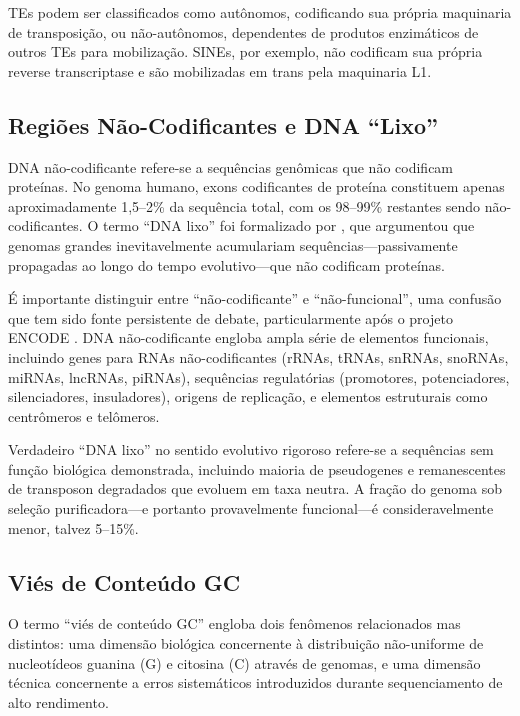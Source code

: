 TEs podem ser classificados como autônomos, codificando sua própria maquinaria de transposição, ou não-autônomos, dependentes de produtos enzimáticos de outros TEs para mobilização. SINEs, por exemplo, não codificam sua própria reverse transcriptase e são mobilizadas em trans pela maquinaria L1.

\subsection{Regiões Não-Codificantes e DNA ``Lixo''}

DNA não-codificante refere-se a sequências genômicas que não codificam proteínas. No genoma humano, exons codificantes de proteína constituem apenas aproximadamente 1,5--2\% da sequência total, com os 98--99\% restantes sendo não-codificantes. O termo ``DNA lixo'' foi formalizado por \textcite{ohno1972}, que argumentou que genomas grandes inevitavelmente acumulariam sequências---passivamente propagadas ao longo do tempo evolutivo---que não codificam proteínas.

É importante distinguir entre ``não-codificante'' e ``não-funcional'', uma confusão que tem sido fonte persistente de debate, particularmente após o projeto ENCODE \parencite{encode2012,doolittle2013,graur2013}. DNA não-codificante engloba ampla série de elementos funcionais, incluindo genes para RNAs não-codificantes (rRNAs, tRNAs, snRNAs, snoRNAs, miRNAs, lncRNAs, piRNAs), sequências regulatórias (promotores, potenciadores, silenciadores, insuladores), origens de replicação, e elementos estruturais como centrômeros e telômeros.

Verdadeiro ``DNA lixo'' no sentido evolutivo rigoroso refere-se a sequências sem função biológica demonstrada, incluindo maioria de pseudogenes e remanescentes de transposon degradados que evoluem em taxa neutra. A fração do genoma sob seleção purificadora---e portanto provavelmente funcional---é consideravelmente menor, talvez 5--15\%.

\subsection{Viés de Conteúdo GC}

O termo ``viés de conteúdo GC'' engloba dois fenômenos relacionados mas distintos: uma dimensão biológica concernente à distribuição não-uniforme de nucleotídeos guanina (G) e citosina (C) através de genomas, e uma dimensão técnica concernente a erros sistemáticos introduzidos durante sequenciamento de alto rendimento.

